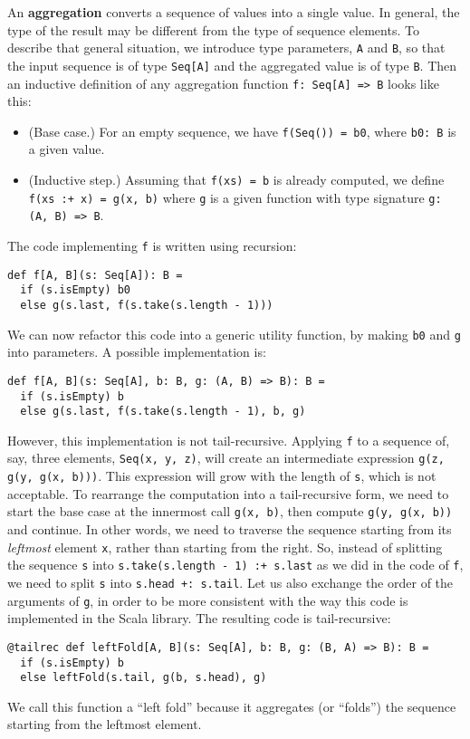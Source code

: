 An \textbf{aggregation} converts a sequence of
values into a single value. In general, the type of the result may
be different from the type of sequence elements. To describe that
general situation, we introduce type parameters, \lstinline!A! and
\lstinline!B!, so that the input sequence is of type \lstinline!Seq[A]!
and the aggregated value is of type \lstinline!B!. Then an inductive
definition of any aggregation function \lstinline!f: Seq[A] => B!
looks like this:
\begin{itemize}
\item (Base case.) For an empty sequence, we have \lstinline!f(Seq()) = b0!,
where \lstinline!b0: B! is a given value.
\item (Inductive step.) Assuming that \lstinline!f(xs) = b! is already
computed, we define \lstinline!f(xs :+ x) = g(x, b)! where \lstinline!g!
is a given function with type signature \lstinline!g: (A, B) => B!.
\end{itemize}
The code implementing \lstinline!f! is written using recursion:
\begin{lstlisting}
def f[A, B](s: Seq[A]): B =
  if (s.isEmpty) b0
  else g(s.last, f(s.take(s.length - 1)))
\end{lstlisting}
We can now refactor this code into a generic utility function, by
making \lstinline!b0! and \lstinline!g! into parameters. A possible
implementation is:
\begin{lstlisting}
def f[A, B](s: Seq[A], b: B, g: (A, B) => B): B =
  if (s.isEmpty) b
  else g(s.last, f(s.take(s.length - 1), b, g)
\end{lstlisting}
However, this implementation is not tail-recursive. Applying \lstinline!f!
to a sequence of, say, three elements, \lstinline!Seq(x, y, z)!,
will create an intermediate expression \lstinline!g(z, g(y, g(x, b)))!.
This expression will grow with the length of \lstinline!s!, which
is not acceptable. To rearrange the computation into a tail-recursive
form, we need to start the base case at the innermost call \lstinline!g(x, b)!,
then compute \lstinline!g(y, g(x, b))! and continue. In other words,
we need to traverse the sequence starting from its \emph{leftmost}
element \lstinline!x!, rather than starting from the right. So, instead
of splitting the sequence \lstinline!s! into \lstinline!s.take(s.length - 1) :+ s.last!
as we did in the code of \lstinline!f!, we need to split \lstinline!s!
into \lstinline!s.head +: s.tail!. Let us also exchange the order
of the arguments of \lstinline!g!, in order to be more consistent
with the way this code is implemented in the Scala library. The resulting
code is tail-recursive:
\begin{lstlisting}
@tailrec def leftFold[A, B](s: Seq[A], b: B, g: (B, A) => B): B =
  if (s.isEmpty) b
  else leftFold(s.tail, g(b, s.head), g)
\end{lstlisting}
We call this function a \textsf{``}left fold\textsf{''} because it aggregates (or
\textsf{``}folds\textsf{''}) the sequence starting from the leftmost element.


